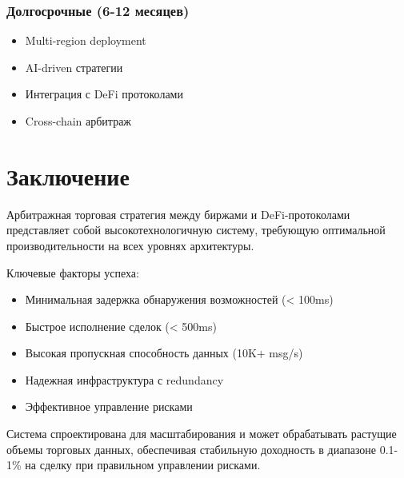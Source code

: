 \documentclass[a4paper,11pt]{article}
\begin{document}
\subsubsection{Долгосрочные (6-12 месяцев)}
\begin{itemize}
    \item Multi-region deployment
    \item AI-driven стратегии
    \item Интеграция с DeFi протоколами
    \item Cross-chain арбитраж
\end{itemize}

\section{Заключение}

Арбитражная торговая стратегия между биржами и DeFi-протоколами представляет собой высокотехнологичную систему, требующую оптимальной производительности на всех уровнях архитектуры.

Ключевые факторы успеха:
\begin{itemize}
    \item Минимальная задержка обнаружения возможностей (< 100ms)
    \item Быстрое исполнение сделок (< 500ms)
    \item Высокая пропускная способность данных (10K+ msg/s)
    \item Надежная инфраструктура с redundancy
    \item Эффективное управление рисками
\end{itemize}

Система спроектирована для масштабирования и может обрабатывать растущие объемы торговых данных, обеспечивая стабильную доходность в диапазоне 0.1-1\% на сделку при правильном управлении рисками.
\end{document}
